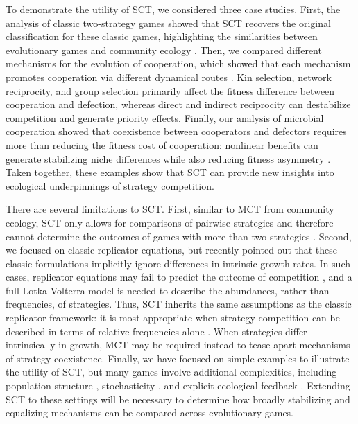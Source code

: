\documentclass[12pt]{article}
\begin{document}
To demonstrate the utility of SCT, we considered three case studies.
First, the analysis of classic two-strategy games showed that SCT recovers the original classification for these classic games, highlighting the similarities between evolutionary games and community ecology \citep{hauert2002effects,szabo2007evolutionary,cooney2020analysis,tarnita2025reconciling}.
Then, we compared different mechanisms for the evolution of cooperation, which showed that each mechanism promotes cooperation via different dynamical routes \citep{nowak2006five}.
Kin selection, network reciprocity, and group selection primarily affect the fitness difference between cooperation and defection, whereas direct and indirect reciprocity can destabilize competition and generate priority effects.
Finally, our analysis of microbial cooperation showed that coexistence between cooperators and defectors requires more than reducing the fitness cost of cooperation: nonlinear benefits can generate stabilizing niche differences while also reducing fitness asymmetry \citep{gore2009snowdrift}.
Taken together, these examples show that SCT can provide new insights into ecological underpinnings of strategy competition.

There are several limitations to SCT.
First, similar to MCT from community ecology, SCT only allows for comparisons of pairwise strategies and therefore cannot determine the outcomes of games with more than two strategies \citep{chesson2000mechanisms}.
Second, we focused on classic replicator equations, but \cite{tarnita2025reconciling} recently pointed out that these classic formulations implicitly ignore differences in intrinsic growth rates.
In such cases, replicator equations may fail to predict the outcome of competition \citep{tarnita2025reconciling}, and a full Lotka-Volterra model is needed to describe the abundances, rather than frequencies, of strategies.
Thus, SCT inherits the same assumptions as the classic replicator framework: it is most appropriate when strategy competition can be described in terms of relative frequencies alone \citep{tarnita2025reconciling}.
When strategies differ intrinsically in growth, MCT may be required instead to tease apart mechanisms of strategy coexistence.
Finally, we have focused on simple examples to illustrate the utility of SCT, but many games involve additional complexities, including population structure \citep{nowak2010evolutionary}, stochasticity \citep{wang2025evolution,bodin2026eco}, and explicit ecological feedback \citep{tarnita2025reconciling}.
Extending SCT to these settings will be necessary to determine how broadly stabilizing and equalizing mechanisms can be compared across evolutionary games.
\end{document}
